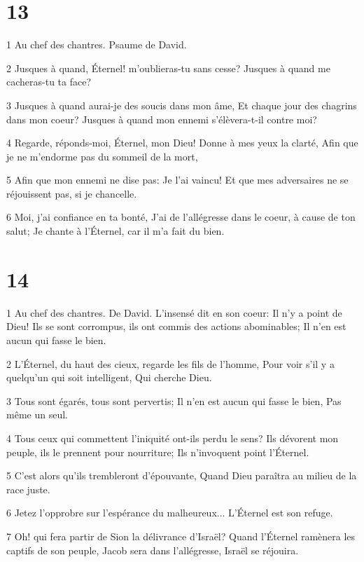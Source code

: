 \chapter{13}

\par 1 Au chef des chantres. Psaume de David.
\par 2 Jusques à quand, Éternel! m'oublieras-tu sans cesse? Jusques à quand me cacheras-tu ta face?
\par 3 Jusques à quand aurai-je des soucis dans mon âme, Et chaque jour des chagrins dans mon coeur? Jusques à quand mon ennemi s'élèvera-t-il contre moi?
\par 4 Regarde, réponds-moi, Éternel, mon Dieu! Donne à mes yeux la clarté, Afin que je ne m'endorme pas du sommeil de la mort,
\par 5 Afin que mon ennemi ne dise pas: Je l'ai vaincu! Et que mes adversaires ne se réjouissent pas, si je chancelle.
\par 6 Moi, j'ai confiance en ta bonté, J'ai de l'allégresse dans le coeur, à cause de ton salut; Je chante à l'Éternel, car il m'a fait du bien.

\chapter{14}

\par 1 Au chef des chantres. De David. L'insensé dit en son coeur: Il n'y a point de Dieu! Ils se sont corrompus, ils ont commis des actions abominables; Il n'en est aucun qui fasse le bien.
\par 2 L'Éternel, du haut des cieux, regarde les fils de l'homme, Pour voir s'il y a quelqu'un qui soit intelligent, Qui cherche Dieu.
\par 3 Tous sont égarés, tous sont pervertis; Il n'en est aucun qui fasse le bien, Pas même un seul.
\par 4 Tous ceux qui commettent l'iniquité ont-ils perdu le sens? Ils dévorent mon peuple, ils le prennent pour nourriture; Ils n'invoquent point l'Éternel.
\par 5 C'est alors qu'ils trembleront d'épouvante, Quand Dieu paraîtra au milieu de la race juste.
\par 6 Jetez l'opprobre sur l'espérance du malheureux... L'Éternel est son refuge.
\par 7 Oh! qui fera partir de Sion la délivrance d'Israël? Quand l'Éternel ramènera les captifs de son peuple, Jacob sera dans l'allégresse, Israël se réjouira.


